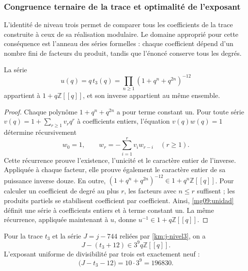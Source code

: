 \subsubsection{Congruence ternaire de la trace et optimalité de l'exposant}
\label{mg09:congruencia}

L'identité de niveau trois permet de comparer tous les coefficients
de la trace construite à ceux de sa réalisation modulaire. Le domaine
approprié pour cette conséquence est l'anneau des séries formelles : chaque
coefficient dépend d'un nombre fini de facteurs du produit,
tandis que l'énoncé conserve tous les degrés.

\begin{lemma}
La série
\begin{equation}
 u(q)=q\,t_3(q)=\prod_{n\geq1}(1+q^n+q^{2n})^{-12}
 \label{mg09:unidad}
\end{equation}
appartient à \(1+q\mathbb Z[[q]]\), et son inverse appartient au
même ensemble.
\end{lemma}

\begin{proof}
Chaque polynôme \(1+q^n+q^{2n}\) a pour terme constant un.
Pour toute série \(v(q)=1+\sum_{r\geq1}v_rq^r\) à
coefficients entiers, l'équation \(v(q)w(q)=1\) détermine
récursivement
\[
 w_0=1,\qquad w_r=-\sum_{i=1}^{r}v_iw_{r-i}\quad(r\geq1).
\]
Cette récurrence prouve l'existence, l'unicité et le caractère entier de l'inverse. Appliquée à chaque facteur, elle prouve également le caractère entier de sa puissance inverse douze. En outre, \((1+q^n+q^{2n})^{-12}\in1+q^n\mathbb Z[[q]]\). Pour calculer un coefficient de degré au plus \(r\), les facteurs avec \(n\leq r\) suffisent ; les produits partiels se stabilisent coefficient par coefficient. Ainsi, \eqref{mg09:unidad} définit une série à coefficients entiers et à terme constant un. La même récurrence, appliquée maintenant à \(u\), donne \(u^{-1}\in1+q\mathbb Z[[q]]\).
\end{proof}

\begin{proposition}
Pour la trace \(t_3\) et la série \(J=j-744\) reliées par
\eqref{km:j-nivel3}, on a
\begin{equation}
 J-(t_3+12)\in3^9q\mathbb Z[[q]].
 \label{mg09:congruencia-exacta}
\end{equation}
L'exposant uniforme de divisibilité par trois est exactement neuf :
\begin{equation}
 [q]\bigl(J-t_3-12\bigr)=10\cdot3^9=196830.
 \label{mg09:optimalidad}
\end{equation}
\end{proposition}

